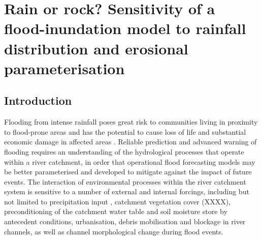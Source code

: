 \chapter{Rain or rock? Sensitivity of a flood-inundation model to rainfall distribution and erosional parameterisation}
\label{chapter_flood_model_sensitivity}

%
%
\section{Introduction}

Flooding from intense rainfall poses great risk to communities living in proximity to flood-prone areas and has the potential to cause loss of life and substantial economic damage in affected areas \citep{pitt2008pitt}. Reliable prediction and advanced warning of flooding requires an understanding of the hydrological processes that operate within a river catchment, in order that operational flood forecasting models may be better parameterised and developed to mitigate against the impact of future events. The interaction of environmental processes within the river catchment system is sensitive to a number of external and internal forcings, including but not limited to precipitation input \citep{nicotina2008impact}, catchment vegetation cover (XXXX), preconditioning of the catchment water table and soil moisture store by antecedent conditions, urbanisation, debris mobilisation and blockage in river channels, as well as channel morphological change during flood events. 

